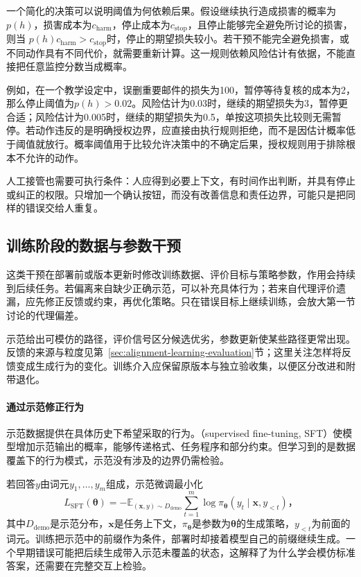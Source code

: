 一个简化的决策可以说明阈值为何依赖后果。假设继续执行造成损害的概率为$p(h)$，损害成本为$c_{\mathrm{harm}}$，停止成本为$c_{\mathrm{stop}}$，且停止能够完全避免所讨论的损害，则当
$p(h)c_{\mathrm{harm}}>c_{\mathrm{stop}}$时，停止的期望损失较小。若干预不能完全避免损害，或不同动作具有不同代价，就需要重新计算。这一规则依赖风险估计有依据，不能直接把任意监控分数当成概率。

例如，在一个教学设定中，误删重要邮件的损失为100，暂停等待复核的成本为2，那么停止阈值为$p(h)>0.02$。风险估计为0.03时，继续的期望损失为3，暂停更合适；风险估计为0.005时，继续的期望损失为0.5，单按这项损失比较则无需暂停。若动作违反的是明确授权边界，应直接由执行规则拒绝，而不是因估计概率低于阈值就放行。概率阈值用于比较允许决策中的不确定后果，授权规则用于排除根本不允许的动作。

人工接管也需要可执行条件：人应得到必要上下文，有时间作出判断，并具有停止或纠正的权限。只增加一个确认按钮，而没有改善信息和责任边界，可能只是把同样的错误交给人重复。

\subsection{训练阶段的数据与参数干预}
\label{sec:alignment-learning}
\label{sec:alignment-learning-demonstration}
\label{sec:alignment-learning-policy}

这类干预在部署前或版本更新时修改训练数据、评价目标与策略参数，作用会持续到后续任务。若偏离来自缺少正确示范，可以补充具体行为；若来自代理评价遗漏，应先修正反馈或约束，再优化策略。只在错误目标上继续训练，会放大第一节讨论的代理偏差。

示范给出可模仿的路径，评价信号区分候选优劣，参数更新使某些路径更常出现。反馈的来源与粒度见第~\ref{sec:alignment-learning-evaluation}节；这里关注怎样将反馈变成生成行为的变化。训练介入应保留原版本与独立验收集，以便区分改进和附带退化。

\paragraph{通过示范修正行为}

示范数据提供在具体历史下希望采取的行为。（supervised fine-tuning, SFT）使模型增加示范输出的概率，能够传递格式、任务程序和部分约束。但学习到的是数据覆盖下的行为模式，示范没有涉及的边界仍需检验。

若回答$y$由词元$y_1,\ldots,y_m$组成，示范微调最小化
\begin{equation}
 L_{\mathrm{SFT}}(\bm{\theta})
 =-\mathbb E_{(\bm{x},y)\sim D_{\mathrm{demo}}}
   \sum_{t=1}^{m}\log\pi_{\bm{\theta}}
          (y_t\mid\bm{x},y_{<t})\text{，}
 \label{eq:alignment-sft}
\end{equation}
其中$D_{\mathrm{demo}}$是示范分布，$\bm{x}$是任务上下文，$\pi_{\bm{\theta}}$是参数为$\bm{\theta}$的生成策略，$y_{<t}$为前面的词元。训练把示范中的前缀作为条件，部署时却接着模型自己的前缀继续生成。一个早期错误可能把后续生成带入示范未覆盖的状态，这解释了为什么学会模仿标准答案，还需要在完整交互上检验。

